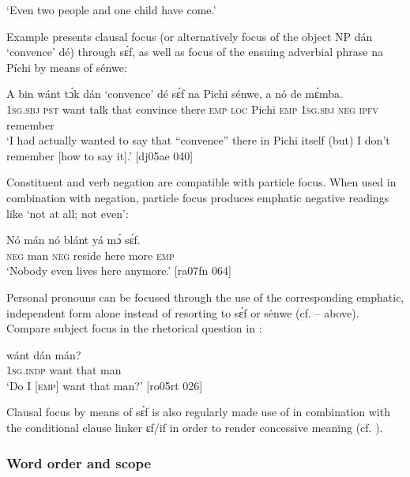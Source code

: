 \glt ‘Even two people and one child have come.’ 
\z

Example  presents clausal focus (or alternatively focus of the object NP dán ‘convence’ dé) through sɛ́f, as well as focus of the ensuing adverbial phrase na Píchi by means of sénwe: 


\ea%
    \label{ex:key:680}
    \gll A    bin  wánt  tɔ́k  dán  ‘convence’  dé    sɛ́f  
na  Pichi  sénwe,  a    nó  de  mɛ́mba.\\
\textsc{1sg.sbj}  \textsc{pst}  want  talk  that  convince    there  \textsc{emp}  
\textsc{loc}  Pichi  \textsc{emp}     \textsc{1sg.sbj}  \textsc{neg}  \textsc{ipfv}  remember\\

\glt ‘I had actually wanted to say that “convence” there in Pichi itself (but) 
I don’t remember [how to say it].’ [dj05ae 040]
\z

Constituent and verb negation are compatible with particle focus. When used in combination with negation, particle focus produces emphatic negative readings like ‘not at all; not even’:


\ea%
    \label{ex:key:681}
    \gll Nó  mán    nó  blánt  yá    mɔ́    sɛ́f.\\
\textsc{neg}  man    \textsc{neg}  reside  here    more  \textsc{emp}\\

\glt ‘Nobody even lives here anymore.’ [ra07fn 064]
\z

Personal pronouns can be focused through the use of the corresponding emphatic, independent form alone instead of resorting to sɛ́f or sénwe (cf. – above). Compare subject focus in the rhetorical question in :


\ea%
    \label{ex:key:682}
    \gll {}    wánt  dán    mán?\\
\textsc{1sg.indp}  want  that    man\\

\glt ‘Do I [\textsc{emp}] want that man?’ [ro05rt 026]
\z

Clausal focus by means of sɛ́f is also regularly made use of in combination with the conditional clause linker ɛf/if in order to render concessive meaning (cf. ).

\subsubsection{Word order and scope}

